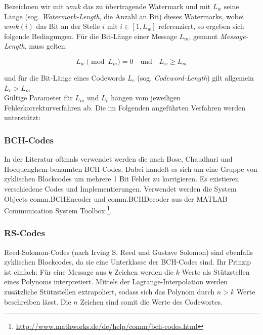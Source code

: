 Bezeichnen wir mit $wmk$ das zu übertragende Watermark und mit ${L}_{w}$ seine Länge (sog. \textit{Watermark-Length}, die Anzahl an Bit) dieses Watermarks, wobei $wmk(i)$ das Bit an der Stelle $i$ mit $i\in[1,{L}_{w}]$ referenziert, so ergeben sich folgende Bedingungen. Für die Bit-L\"ange einer Message ${L}_{m}$, genannt \textit{Message-Length}, muss gelten:

	 \begin{equation}
		 {L}_{w} \pmod{{L}_{m}} = 0 \quad\mbox{und}\quad {L}_{w}\geq{L}_{m} 		\label{equ:wmkseqlength}
	 \end{equation} 

und für die Bit-Länge eines Codewords ${L}_{c}$ (sog. \textit{Codeword-Length}) gilt allgemein ${L}_{c} > {L}_{m}$
\\
Gültige Parameter für ${L}_{m}$ und ${L}_{c}$ hängen vom jeweiligen Fehlerkorrekturverfahren ab. Die im Folgenden angeführten Verfahren werden unterstützt:

\subsubsection{BCH-Codes}

In der Literatur\cite{chang2012location}\cite{huang2002blind} oftmals verwendet werden die nach Bose, Chaudhuri und Hocquenghem benannten BCH-Codes\cite{bose1960class}. Dabei handelt es sich um eine Gruppe von zyklischen Blockcodes um mehrere 1 Bit Fehler zu korrigieren. Es existieren verschiedene Codes und Implementierungen. Verwendet werden die System Objects \textsf{comm.BCHEncoder} und \textsf{comm.BCHDecoder} aus der MATLAB Communication System Toolbox.\footnote{\url{http://www.mathworks.de/de/help/comm/bch-codes.html}}.

\subsubsection{RS-Codes} 

Reed-Solomon-Codes\cite{reed1960polynomial} (nach Irving S. Reed und Gustave Solomon) sind ebenfalls zyklischen Blockcodes, da sie eine Unterklasse der BCH-Codes sind. Ihr Prinzip ist einfach: Für eine Message aus $k$ Zeichen werden die $k$ Werte als Stützstellen eines Polynoms interpretiert. Mittels der Lagrange-Interpolation werden zusätzliche Stützstellen extrapoliert, sodass sich das Polynom durch $n>k$ Werte beschreiben lässt. Die $n$ Zeichen sind somit die Werte des Codewortes.

